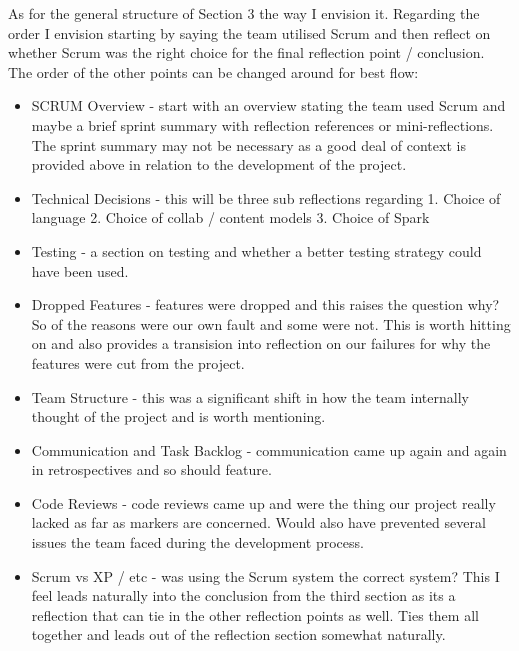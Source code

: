 \documentclass{l3proj}
\begin{document}
As for the general structure of Section 3 the way I envision it. Regarding the order I envision starting by saying the team utilised Scrum and then reflect on whether Scrum was the right choice for the final reflection point / conclusion. The order of the other points can be changed around for best flow:
\begin{itemize}
\item SCRUM Overview - start with an overview stating the team used Scrum and maybe a brief sprint summary with reflection references or mini-reflections. The sprint summary may not be necessary as a good deal of context is provided above in relation to the development of the project.
\item Technical Decisions - this will be three sub reflections regarding 1. Choice of language 2. Choice of collab / content models 3. Choice of Spark
\item Testing - a section on testing and whether a better testing strategy could have been used.
\item Dropped Features - features were dropped and this raises the question why? So of the reasons were our own fault and some were not. This is worth hitting on and also provides a transision into reflection on our failures for why the features were cut from the project.
\item Team Structure - this was a significant shift in how the team internally thought of the project and is worth mentioning.
\item Communication and Task Backlog - communication came up again and again in retrospectives and so should feature.
\item Code Reviews - code reviews came up and were the thing our project really lacked as far as markers are concerned. Would also have prevented several issues the team faced during the development process.
\item Scrum vs XP / etc - was using the Scrum system the correct system? This I feel leads naturally into the conclusion from the third section as its a reflection that can tie in the other reflection points as well. Ties them all together and leads out of the reflection section somewhat naturally.
\end{itemize} 
\end{document}
